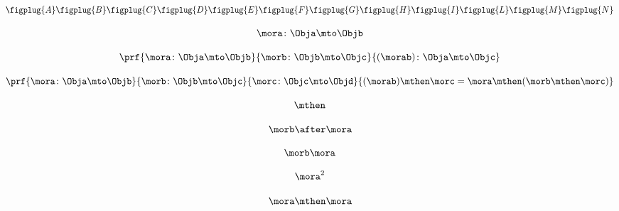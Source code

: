 \begin{forslides}
         \begin{equation}
            \label{eq:semicats-slides-60}
            \centering
    \figplug{A}
    \figplug{B}
    \figplug{C}
    \figplug{D}
    \figplug{E}
    \figplug{F}
    \figplug{G}
    \figplug{H}
    \figplug{I}
    \figplug{L}
    \figplug{M}
    \figplug{N}
        \end{equation}
        
         \begin{equation}
            \label{eq:semicats-slides-61}
            \mora\colon \Obja \mto \Objb
        \end{equation}
        
         \begin{equation}
            \label{eq:semicats-slides-62}
            \prf{
        \mora \colon \Obja \mto \Objb
    }{
        \morb\colon \Objb \mto \Objc
    }{
        (\morab )\colon \Obja \mto \Objc
    }
        \end{equation}
        
         \begin{equation}
            \label{eq:semicats-slides-63}
            \prf{
        \mora \colon \Obja \mto \Objb
    }{
        \morb\colon \Objb \mto \Objc
    }{
        \morc \colon \Objc \mto \Objd
    }{
        (\morab ) \mthen \morc = \mora \mthen ( \morb  \mthen \morc )
    }
        \end{equation}
        
         \begin{equation}
            \label{eq:semicats-slides-64}
            \mthen
        \end{equation}
        
         \begin{equation}
            \label{eq:semicats-slides-65}
            \morb\after \mora
        \end{equation}
        
        
         \begin{equation}
            \label{eq:semicats-slides-66}
            \morb \mora
        \end{equation}
        
        
         \begin{equation}
            \label{eq:semicats-slides-67}
            \mora^2
        \end{equation}
        
        
         \begin{equation}
            \label{eq:semicats-slides-68}
            \mora \mthen \mora
        \end{equation}
        

\end{forslides}
